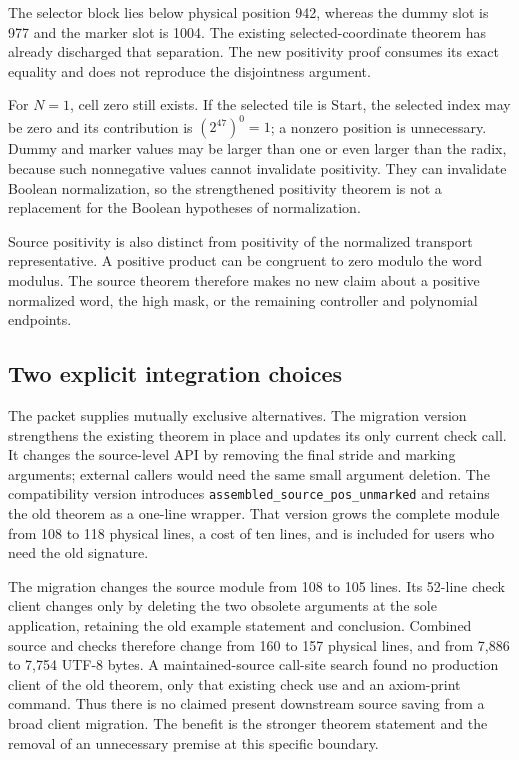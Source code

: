 \documentclass[11pt]{article}
\newcommand{\code}[1]{\nolinkurl{#1}}
\begin{document}
The selector block lies below physical position 942, whereas the dummy slot is 977 and the marker slot is 1004. The existing selected-coordinate theorem has already discharged that separation. The new positivity proof consumes its exact equality and does not reproduce the disjointness argument.

For $N=1$, cell zero still exists. If the selected tile is Start, the selected index may be zero and its contribution is $(2^{47})^0=1$; a nonzero position is unnecessary. Dummy and marker values may be larger than one or even larger than the radix, because such nonnegative values cannot invalidate positivity. They can invalidate Boolean normalization, so the strengthened positivity theorem is not a replacement for the Boolean hypotheses of normalization.

Source positivity is also distinct from positivity of the normalized transport representative. A positive product can be congruent to zero modulo the word modulus. The source theorem therefore makes no new claim about a positive normalized word, the high mask, or the remaining controller and polynomial endpoints.

\subsection*{Two explicit integration choices}

The packet supplies mutually exclusive alternatives. The migration version strengthens the existing theorem in place and updates its only current check call. It changes the source-level API by removing the final stride and marking arguments; external callers would need the same small argument deletion. The compatibility version introduces \code{assembled_source_pos_unmarked} and retains the old theorem as a one-line wrapper. That version grows the complete module from 108 to 118 physical lines, a cost of ten lines, and is included for users who need the old signature.

The migration changes the source module from 108 to 105 lines. Its 52-line check client changes only by deleting the two obsolete arguments at the sole application, retaining the old example statement and conclusion. Combined source and checks therefore change from 160 to 157 physical lines, and from 7,886 to 7,754 UTF-8 bytes. A maintained-source call-site search found no production client of the old theorem, only that existing check use and an axiom-print command. Thus there is no claimed present downstream source saving from a broad client migration. The benefit is the stronger theorem statement and the removal of an unnecessary premise at this specific boundary.
\end{document}
